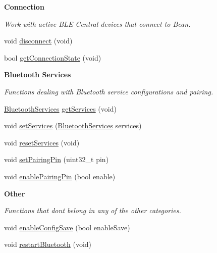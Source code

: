 \begin{Indent}{\bf Connection}\par
{\em Work with active B\+L\+E Central devices that connect to Bean. }\begin{DoxyCompactItemize}
\item 
void \hyperlink{class_bean_class_a1509dbbc3ddbd08725e2cb65a9289e90}{disconnect} (void)
\item 
bool \hyperlink{class_bean_class_ab426b11e8bee60de92707254c0501c20}{get\+Connection\+State} (void)
\end{DoxyCompactItemize}
\end{Indent}
\begin{Indent}{\bf Bluetooth Services}\par
{\em Functions dealing with Bluetooth service configurations and pairing. }\begin{DoxyCompactItemize}
\item 
\hyperlink{struct_a_d_v___s_w_i_t_c_h___e_n_a_b_l_e_d___t}{Bluetooth\+Services} \hyperlink{class_bean_class_ae2547ba8f4b67a9ac774ce6d89b14dcb}{get\+Services} (void)
\item 
void \hyperlink{class_bean_class_a17b6e95f7b93e39ae83971ed796edd5b}{set\+Services} (\hyperlink{struct_a_d_v___s_w_i_t_c_h___e_n_a_b_l_e_d___t}{Bluetooth\+Services} services)
\item 
void \hyperlink{class_bean_class_a98a040220137d9dd047250e247bd4ebd}{reset\+Services} (void)
\item 
void \hyperlink{class_bean_class_a11cb6a1ec42d1af44af840dff1875d00}{set\+Pairing\+Pin} (uint32\+\_\+t pin)
\item 
void \hyperlink{class_bean_class_afff90ba1cdb690b88c1b8b4917e71b32}{enable\+Pairing\+Pin} (bool enable)
\end{DoxyCompactItemize}
\end{Indent}
\begin{Indent}{\bf Other}\par
{\em Functions that don\textquotesingle{}t belong in any of the other categories. }\begin{DoxyCompactItemize}
\item 
void \hyperlink{class_bean_class_a2ae5aa1b912ca67715670f1dea865431}{enable\+Config\+Save} (bool enable\+Save)
\item 
void \hyperlink{class_bean_class_a8823b48c41914a1a32d6dd3974ebf57d}{restart\+Bluetooth} (void)
\end{DoxyCompactItemize}
\end{Indent}


